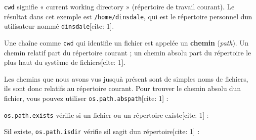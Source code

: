 \texttt{cwd} signifie « current working directory » (répertoire de
travail courant). Le résultat dans cet exemple est
\texttt{/home/dinsdale}, qui est le répertoire personnel
d\textquotesingle un utilisateur nommé \texttt{dinsdale}{[}cite: 1{]}.

Une chaîne comme \texttt{cwd} qui identifie un fichier est appelée un
\textbf{chemin} (\emph{path}). Un chemin relatif part du répertoire
courant ; un chemin absolu part du répertoire le plus haut du système de
fichiers{[}cite: 1{]}.

Les chemins que nous avons vus jusqu\textquotesingle à présent sont de
simples noms de fichiers, ils sont donc relatifs au répertoire courant.
Pour trouver le chemin absolu d\textquotesingle un fichier, vous pouvez
utiliser \texttt{os.path.abspath}{[}cite: 1{]} :

\begin{Shaded}
\begin{Highlighting}[]
\OperatorTok{\textgreater{}\textgreater{}\textgreater{}}\NormalTok{)}
\end{Highlighting}
\end{Shaded}

\texttt{os.path.exists} vérifie si un fichier ou un répertoire
existe{[}cite: 1{]} :

\begin{Shaded}
\begin{Highlighting}[]
\OperatorTok{\textgreater{}\textgreater{}\textgreater{}}\NormalTok{)}
\end{Highlighting}
\end{Shaded}

S\textquotesingle il existe, \texttt{os.path.isdir} vérifie
s\textquotesingle il s\textquotesingle agit d\textquotesingle un
répertoire{[}cite: 1{]} :

\begin{Shaded}
\begin{Highlighting}[]
\OperatorTok{\textgreater{}\textgreater{}\textgreater{}}\NormalTok{)}
\OperatorTok{\textgreater{}\textgreater{}\textgreater{}}\NormalTok{)}
\end{Highlighting}
\end{Shaded}

